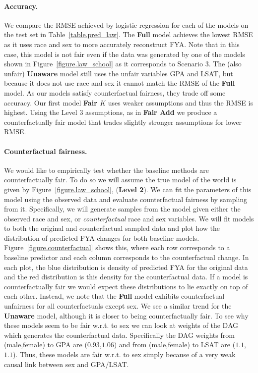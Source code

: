 \paragraph{Accuracy.}
We compare the RMSE achieved by logistic regression for each of the
models on the test set in Table~\ref{table.pred_law}.  The
\textbf{Full} model achieves the lowest RMSE as it uses race and sex
to more accurately reconstruct FYA. Note that in this case, this model
is not fair even if the data was generated by one of the models shown
in Figure~\ref{figure.law_school} as it corresponds to Scenario 3. The
(also unfair) \textbf{Unaware} model still uses the unfair variables
GPA and LSAT, but because it does not use race and sex it cannot match
the RMSE of the \textbf{Full} model. As our models satisfy
counterfactual fairness, they trade off some accuracy. Our first model
\textbf{Fair $K$} uses weaker assumptions and thus the RMSE is
highest. Using the Level 3 assumptions, as in \textbf{Fair Add} we
produce a counterfactually fair model that trades
slightly stronger assumptions for lower RMSE.


\paragraph{Counterfactual fairness.}
We would like to empirically test whether the baseline methods are
counterfactually fair. To do so we will assume the true model of the
world is given by Figure~\ref{figure.law_school}, (\textbf{Level
  2}). We can fit the parameters of this model using the observed data
and evaluate counterfactual fairness by sampling from
it. Specifically, we will generate samples from the model given either
the observed race and sex, or \emph{counterfactual} race and sex
variables. We will fit models to both the original and counterfactual
sampled data and plot how the distribution of predicted FYA changes
for both baseline models. Figure~\ref{figure.counterfactual} shows
this, where each row corresponds to a baseline predictor and each
column corresponds to the counterfactual change. In each plot, the blue
distribution is density of predicted FYA for the original data and the
red distribution is this density for the counterfactual data. If a
model is counterfactually fair we would expect these distributions to
lie exactly on top of each other. Instead, we note that the
\textbf{Full} model exhibits counterfactual unfairness for all
counterfactuals except sex. We see a similar trend for the
\textbf{Unaware} model, although it is closer to being
counterfactually fair. To see why these models seem to be fair
w.r.t. to sex we can look at weights of the DAG which generates the
counterfactual data. Specifically the DAG weights from (male,female)
to GPA are ($0.93$,$1.06$) and from (male,female) to LSAT are
($1.1$,$1.1$). Thus, these models are fair w.r.t. to sex simply
because of a very weak causal link between sex and GPA/LSAT.

